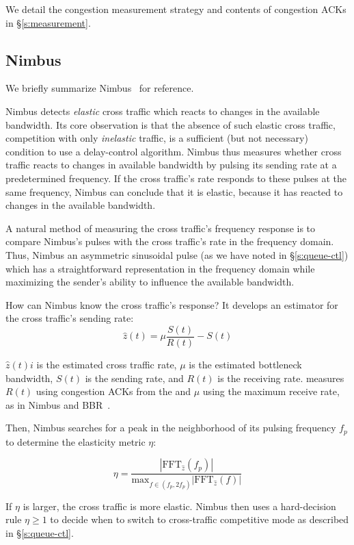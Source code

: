 We detail the congestion measurement strategy and contents of congestion ACKs in \S\ref{s:measurement}.


\begin{Appendix}
\section{Nimbus}\label{s:app:nimbus}

We briefly summarize Nimbus~\cite{nimbus} for reference.

Nimbus detects \emph{elastic} cross traffic which reacts to changes in the available bandwidth. Its core observation is that the absence of such elastic cross traffic, \ie competition with only \emph{inelastic} traffic, is a sufficient (but not necessary) condition to use a delay-control algorithm.
Nimbus thus measures whether cross traffic reacts to changes in available bandwidth by pulsing its sending rate at a predetermined frequency.
If the cross traffic's rate responds to these pulses at the same frequency, Nimbus can conclude that it is elastic, because it has reacted to changes in the available bandwidth.

A natural method of measuring the cross traffic's frequency response is to compare Nimbus's pulses with the cross traffic's rate in the frequency domain.
Thus, Nimbus an asymmetric sinusoidal pulse (as we have noted in \S\ref{s:queue-ctl}) which has a straightforward representation in the frequency domain while maximizing the sender's ability to influence the available bandwidth.

How can Nimbus know the cross traffic's response? It develops an estimator for the cross traffic's sending rate:
\begin{equation}
    \hat{z}(t) = \mu\frac{S(t)}{R(t)} - S(t)
\end{equation}

$\hat{z}(t)i$ is the estimated cross traffic rate, $\mu$ is the estimated bottleneck bandwidth, $S(t)$ is the sending rate, and $R(t)$ is the receiving rate. 
\name measures $R(t)$ using congestion ACKs from the \outbox and $\mu$ using the maximum receive rate, as in Nimbus and BBR~\cite{bbr}.

Then, Nimbus searches for a peak in the neighborhood of its pulsing frequency $f_p$ to determine the elasticity metric $\eta$:

\begin{equation}
    \eta = \frac{|\text{FFT}_{\hat{z}}(f_p)|}{\text{max}_{f \in (f_p, 2f_p)} |\text{FFT}_{\hat{z}}(f)|}
\end{equation}

If $\eta$ is larger, the cross traffic is more elastic.
Nimbus then uses a hard-decision rule $\eta \ge 1$ to decide when to switch to cross-traffic competitive mode as described in \S\ref{s:queue-ctl}.

\end{Appendix}

